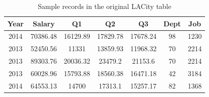\begin{table}[t]
\small
\centering
\caption{Sample records in the original LACity table\label{T:org_data}}
\begin{tabular}{|c|c|c|c|c|c|c|}
\hline
        Year  & Salary  & Q1 & Q2 & Q3 & Dept & Job \\ \hline
        2014 & 70386.48  & 16129.89 & 17829.78 & 17678.24 &  98 & 1230 \\
  2013 & 52450.56  & 11331    & 13859.93 & 11968.32 &  70 & 2214\\
  2013 & 89303.76  & 20036.32 & 23479.2  & 21153.6  &  70& 2214\\
  2013 & 60028.96  & 15793.88 & 18560.38 & 16471.18 &  42 & 3184 \\
  2014 & 64553.13  & 14700    & 17313.1  & 15257.17 & 82 & 1368 \\
\hline
\end{tabular}


\end{table}
